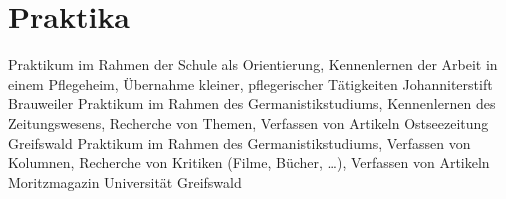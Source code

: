 \documentclass[11pt,a4paper]{moderncv}
\begin{document}
    \section{Praktika}
        {Praktikum im Rahmen der Schule als Orientierung, \newline%
        Kennenlernen der Arbeit in einem Pflegeheim, \newline%
        Übernahme kleiner, pflegerischer Tätigkeiten\newline}{}%
        {Johanniterstift Brauweiler}{}
        {Praktikum im Rahmen des Germanistikstudiums, \newline%
        Kennenlernen des Zeitungswesens, %
        Recherche von Themen, \newline%
        Verfassen von Artikeln\newline}{}%
        {Ostseezeitung Greifswald}{}
        {Praktikum im Rahmen des Germanistikstudiums, %
        Verfassen von Kolumnen, \newline%
        Recherche von Kritiken (Filme, Bücher, \dots), %
        Verfassen von Artikeln\newline}{}%
        {Moritzmagazin Universität Greifswald}{}%
\end{document}
